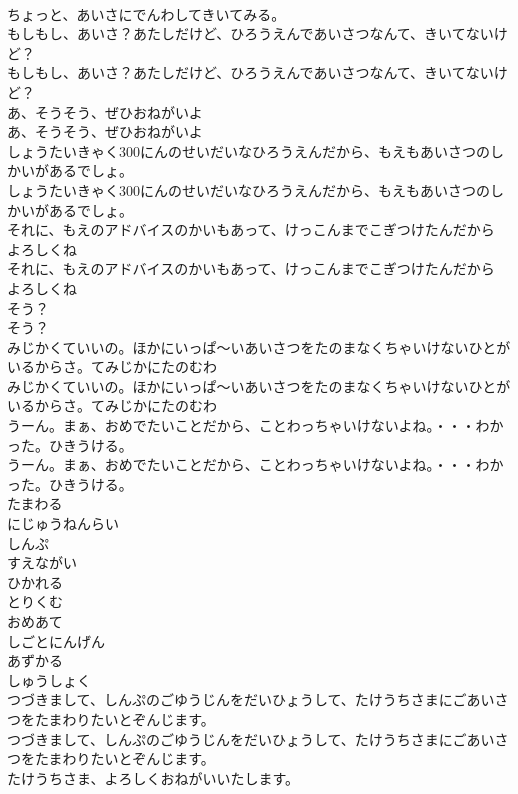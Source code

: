 \documentclass[8pt]{extreport}
\begin{document}
\begin{CJK}{UTF8}{min}
\\	ちょっと、あいさにでんわしてきいてみる。
\\	もしもし、あいさ？あたしだけど、ひろうえんであいさつなんて、きいてないけど？
\\	もしもし、あいさ？あたしだけど、ひろうえんであいさつなんて、きいてないけど？
\\	あ、そうそう、ぜひおねがいよ
\\	あ、そうそう、ぜひおねがいよ
\\	しょうたいきゃく300にんのせいだいなひろうえんだから、もえもあいさつのしかいがあるでしょ。
\\	しょうたいきゃく300にんのせいだいなひろうえんだから、もえもあいさつのしかいがあるでしょ。
\\	それに、もえのアドバイスのかいもあって、けっこんまでこぎつけたんだから
\\	よろしくね
\\	それに、もえのアドバイスのかいもあって、けっこんまでこぎつけたんだから
\\	よろしくね
\\	そう？
\\	そう？
\\	みじかくていいの。ほかにいっぱ～いあいさつをたのまなくちゃいけないひとがいるからさ。てみじかにたのむわ
\\	みじかくていいの。ほかにいっぱ～いあいさつをたのまなくちゃいけないひとがいるからさ。てみじかにたのむわ
\\	うーん。まぁ、おめでたいことだから、ことわっちゃいけないよね。・・・わかった。ひきうける。
\\	うーん。まぁ、おめでたいことだから、ことわっちゃいけないよね。・・・わかった。ひきうける。
\\	たまわる
\\	にじゅうねんらい
\\	しんぷ
\\	すえながい
\\	ひかれる
\\	とりくむ
\\	おめあて
\\	しごとにんげん
\\	あずかる
\\	しゅうしょく
\\	つづきまして、しんぷのごゆうじんをだいひょうして、たけうちさまにごあいさつをたまわりたいとぞんじます。
\\	つづきまして、しんぷのごゆうじんをだいひょうして、たけうちさまにごあいさつをたまわりたいとぞんじます。
\\	たけうちさま、よろしくおねがいいたします。

\end{CJK}
\end{document}
